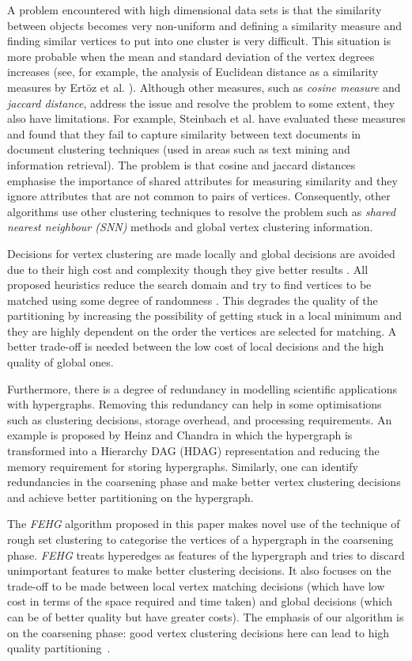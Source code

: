 \documentclass[twocolumn]{svjour3}          \smartqed
\begin{document}
A problem encountered with high dimensional data sets is that the similarity between objects becomes very non-uniform and defining a similarity measure and finding similar vertices to put into one cluster is very difficult.  This situation is more probable when the mean and standard deviation of the vertex degrees increases (see, for example, the analysis of {Euclidean distance} as a similarity measures by Ert{\"o}z et al. \cite{ertozetal2003}).  Although other measures, such as \textit{cosine measure} and \textit{jaccard distance}, address the issue and resolve the problem to some extent, they also have limitations. For example, Steinbach et al. \cite{steinbach2000} have evaluated these measures and found that they fail to capture similarity between text documents in document clustering techniques (used in areas such as text mining and information retrieval). The problem is that cosine and jaccard distances emphasise the importance of shared attributes for measuring similarity and they ignore attributes that are not common to pairs of vertices. Consequently, other algorithms use other clustering techniques to resolve the problem such as \textit{shared nearest neighbour (SNN)} methods \cite{ertoz2002new} and global vertex clustering information. 

Decisions for vertex clustering are made locally and global decisions are avoided due to their high cost and complexity though they give better results \cite{ale2006}. All proposed heuristics reduce the search domain and try to find vertices to be matched using some degree of randomness \cite{devetal2006}. This degrades the quality of the partitioning by increasing the possibility of getting stuck in a local minimum and they are highly dependent on the order the vertices are selected for matching. A better trade-off is needed between the low cost of local decisions and the high quality of global ones.

Furthermore, there is a degree of redundancy in modelling scientific applications with hypergraphs. Removing this redundancy can help in some optimisations such as clustering decisions, storage overhead, and processing requirements. An example is proposed by Heinz and Chandra \cite{bey2014} in which the hypergraph is transformed into a Hierarchy DAG (HDAG) representation and reducing the memory requirement for storing hypergraphs. Similarly, one can identify redundancies in the coarsening phase and make better vertex clustering decisions and achieve better partitioning on the hypergraph. 

The \textit{FEHG} algorithm proposed in this paper makes novel use of the technique of rough set clustering to categorise the vertices of a hypergraph in the coarsening phase. \textit{FEHG} treats hyperedges as features of the hypergraph and tries to discard unimportant features to make better clustering decisions. It also focuses on the trade-off to be made between local vertex matching decisions (which have low cost in terms of the space required and time taken) and global decisions (which can be of better quality but have greater costs). The emphasis of our algorithm is on the coarsening phase: good vertex clustering decisions here can lead to high quality partitioning~\cite{karytech2002}. 
\end{document}
